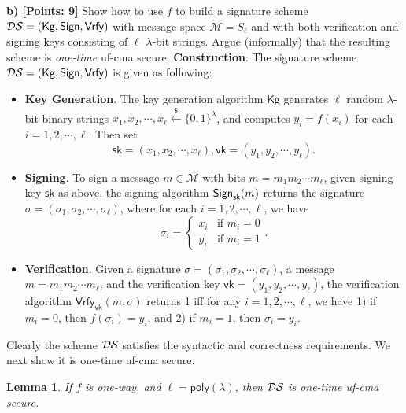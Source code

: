 \documentclass[12pt]{article}
\newcommand{\bits}{\{0,1\}}
\newcommand{\getsr}{\stackrel{\$}{\gets}}
\newcommand{\Vrfy}{\textsf{Vrfy}}
\newcommand{\M}{\mathcal{M}}
\newtheorem{lemma}[theorem]{Lemma}
\theoremstyle{definition}
\newcommand{\Kg}{\textsf{Kg}}
\newcommand{\sk}{\textsf{sk}}
\begin{document}
\newcommand{\vk}{\textsf{vk}}
{\bf b) [Points: 9]} Show how to use $f$ to build a signature scheme $\DS = (\Kg, \Sign, \Vrfy)$ with message space $\M = S_{\ell}$ and with both verification and signing keys consisting of $\ell$ $\lambda$-bit strings. Argue (informally) that the resulting scheme is \emph{one-time} uf-cma secure.
{\bf Construction}: 
The signature scheme $\DS = (\Kg, \Sign, \Vrfy)$ is given as following:
\begin{itemize}
\item {\bf Key Generation}. The key generation algorithm $\Kg$ generates $\ell$ random $\lambda$-bit binary strings $x_1, x_2, \cdots, x_{\ell} \getsr \bits^\lambda$, and computes $y_i = f(x_i)$ for each $i=1,2,\cdots,\ell$. Then set
$$\sk = (x_1,x_2,\cdots,x_{\ell}), \vk = (y_1, y_2,\cdots,y_{\ell}).$$
\item {\bf Signing}. To sign a message $m \in \M$ with bits $m=m_1m_2\cdots m_{\ell}$, given signing key $\sk$ as above, the signing algorithm $\Sign_{\sk}(m)$ returns the signature $\sigma = (\sigma_1, \sigma_2, \cdots, \sigma_\ell)$, where for each $i=1,2,\cdots, \ell$, we have 
$$\sigma_i = \begin{cases}
x_i & \textrm{if $m_i=0$} \\
y_i & \textrm{if $m_i=1$}
\end{cases}.$$
\item {\bf Verification}. Given a signature $\sigma = (\sigma_1, \sigma_2, \cdots, \sigma_\ell)$, a message $m = m_1m_2\cdots m_{\ell}$, and the verification key $\vk = (y_1,y_2,\cdots, y_{\ell})$, the verification algorithm $\Vrfy_{\vk}(m,\sigma)$ returns 1 iff for any $i=1,2,\cdots, \ell$, we have 1) if $m_i=0$, then $f(\sigma_i) = y_i$, and 2) if $m_i=1$, then $\sigma_i = y_i$.
\end{itemize}
Clearly the scheme $\mathcal{DS}$ satisfies the syntactic and correctness requirements. We next show it is one-time uf-cma secure.
\newcommand{\poly}{\mathsf{poly}}
\begin{lemma}
If $f$ is one-way, and $\ell = \poly(\lambda)$, then $\mathcal{DS}$ is one-time uf-cma secure.
\end{lemma}
\newcommand{\SO}{\textsf{S}}
\end{document}
